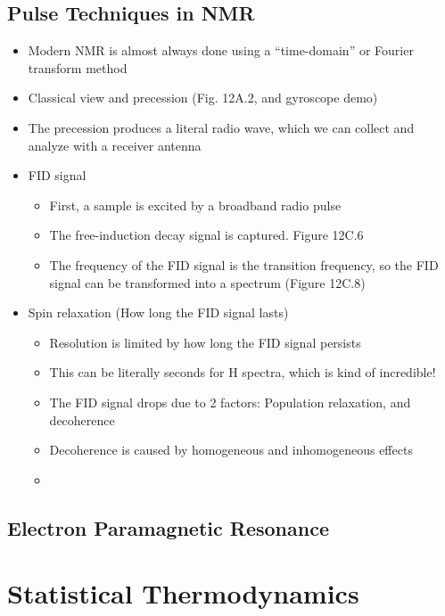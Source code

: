 \documentclass[12pt, openany, letterpaper]{memoir}
\begin{document}
\section{Pulse Techniques in NMR}
\begin{itemize}
	\item Modern NMR is almost always done using a ``time-domain'' or Fourier transform method
	\item Classical view and precession (Fig. 12A.2, and gyroscope demo)
	\item The precession produces a literal radio wave, which we can collect and analyze with a receiver antenna
	\item FID signal
	\begin{itemize}
		\item First, a sample is excited by a broadband radio pulse
		\item The free-induction decay signal is captured. Figure 12C.6
		\item The frequency of the FID signal is the transition frequency, so the FID signal can be transformed into a spectrum (Figure 12C.8)
	\end{itemize}
	\item Spin relaxation (How long the FID signal lasts)
	\begin{itemize}
		\item Resolution is limited by how long the FID signal persists
		\item This can be literally seconds for H spectra, which is kind of incredible!
		\item The FID signal drops due to 2 factors: Population relaxation, and decoherence
		\item Decoherence is caused by homogeneous and inhomogeneous effects
		\item 
	\end{itemize}
\end{itemize}
\section{Electron Paramagnetic Resonance}



\chapter{Statistical Thermodynamics}
\end{document}
